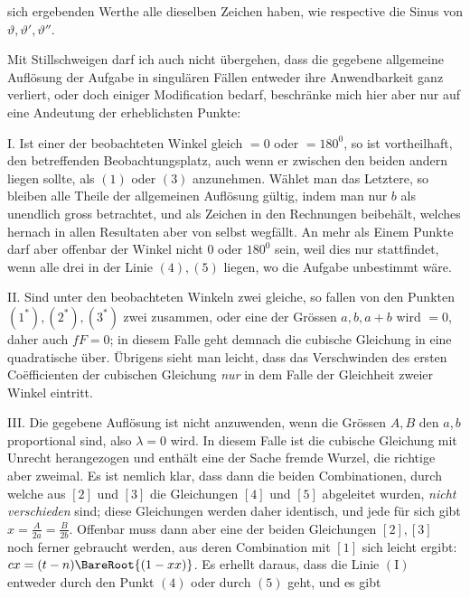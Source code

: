 %
sich ergebenden Werthe alle dieselben Zeichen haben, wie respective die Sinus von \(\vartheta,\vartheta',\vartheta''\).

Mit Stillschweigen darf ich auch nicht übergehen, dass die gegebene allgemeine Auflösung der Aufgabe in singulären Fällen entweder ihre Anwendbarkeit ganz verliert, oder doch einiger Modification bedarf, beschränke mich hier aber nur auf eine Andeutung der erheblichsten Punkte:

I. Ist einer der beobachteten Winkel gleich \(=0\) oder \(=180^0\), so ist vortheilhaft, den betreffenden Beobachtungsplatz, auch wenn er zwischen den beiden andern liegen sollte, als \((1)\) oder \((3)\) anzunehmen. Wählet man das Letztere, so bleiben alle Theile der allgemeinen Auflösung gültig, indem man nur \(b\) als unendlich gross betrachtet, und als Zeichen in den Rechnungen beibehält, welches hernach in allen Resultaten aber von selbst wegfällt. An mehr als Einem Punkte darf aber offenbar der Winkel nicht \(0\) oder \(180^0\) sein, weil dies nur stattfindet, wenn alle drei in der Linie \((4),(5)\) liegen, wo die Aufgabe unbestimmt wäre.

II. Sind unter den beobachteten Winkeln zwei gleiche, so fallen von den Punkten \((1^*),(2^*),(3^*)\) zwei zusammen, oder eine der Grössen \(a,b,a+b\) wird \(=0\), daher auch \(fF=0\); in diesem Falle geht demnach die cubische Gleichung in eine quadratische über. Übrigens sieht man leicht, dass das Verschwinden des ersten Coëfficienten der cubischen Gleichung \textit{nur} in dem Falle der Gleichheit zweier Winkel eintritt.

III. Die gegebene Auflösung ist nicht anzuwenden, wenn die Grössen \(A,B\) den \(a,b\) proportional sind, also \(\lambda=0\) wird. In diesem Falle ist die cubische Gleichung mit Unrecht herangezogen und enthält eine der Sache fremde Wurzel, die richtige aber zweimal. Es ist nemlich klar, dass dann die beiden Combinationen, durch welche aus \([2]\) und \([3]\) die Gleichungen \([4]\) und \([5]\) abgeleitet wurden, \textit{nicht verschieden} sind; diese Gleichungen werden daher identisch, und jede für sich gibt \(x=\frac A{2a}=\frac B{2b}\). Offenbar muss dann aber eine der beiden Gleichungen \([2],[3]\) noch ferner gebraucht werden, aus deren Combination mit \([1]\) sich leicht ergibt: \(cx=(t-n)\BareRoot{(1-xx)}\). Es erhellt daraus, dass die Linie \(\mathrm{(I)}\) entweder durch den Punkt \((4)\) oder durch \((5)\) geht, und es gibt
